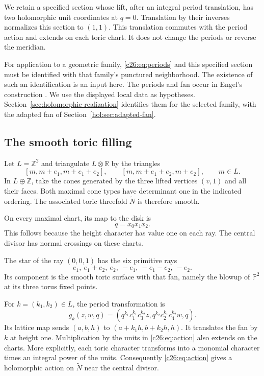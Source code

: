 We retain a specified section whose lift, after an integral period
translation, has two holomorphic unit coordinates at $q=0$.
Translation by their inverses normalizes this section to $(1,1)$.
This translation commutes with the period action and extends on each
toric chart. It does not change the periods or reverse the meridian.

For application to a geometric family, \eqref{c26:eq:periods} and this
specified section must be identified with that family's punctured
neighborhood. The existence of such an identification is an input here.
The periods and fan occur in Engel's construction
\cite[Propositions 2.7--2.9, pp.~5--7]{Engel}.
We use the displayed local data as hypotheses.
Section~\ref{sec:holomorphic-realization} identifies them for the
selected family, with the adapted fan of
Section~\ref{hol:sec:adapted-fan}.

\subsection{The smooth toric filling}

Let $L=\mathbb Z^2$ and triangulate $L\otimes\mathbb R$ by the triangles
\[
[m,m+e_1,m+e_1+e_2],\qquad
[m,m+e_1+e_2,m+e_2],\qquad m\in L.
\]
In $L\oplus\mathbb Z$, take the cones generated by the three lifted
vertices $(v,1)$ and all their faces.
Both maximal cone types have determinant one in the indicated ordering.
The associated toric threefold $\widetilde N$ is therefore smooth.

On every maximal chart, its map to the disk is
\begin{equation}\label{c26:eq:chart}
q=x_0x_1x_2.
\end{equation}
This follows because the height character has value one on each ray.
The central divisor has normal crossings on these charts.

The star of the ray $(0,0,1)$ has the six primitive rays
\[
e_1,\ e_1+e_2,\ e_2,\ -e_1,\ -e_1-e_2,\ -e_2.
\]
Its component is the smooth toric surface with that fan, namely the
blowup of $\mathbb P^2$ at its three torus fixed points.

For $k=(k_1,k_2)\in L$, the period transformation is
\begin{equation}\label{c26:eq:action}
g_k(z,w,q)=
\left(q^{k_1}c_1^{k_1}c_3^{k_2}z,
q^{k_2}c_2^{k_1}c_4^{k_2}w,q\right).
\end{equation}
Its lattice map sends $(a,b,h)$ to $(a+k_1h,b+k_2h,h)$.
It translates the fan by $k$ at height one.
Multiplication by the units in \eqref{c26:eq:action} also extends on the
charts. More explicitly, each toric character transforms into a monomial
character times an integral power of the units.
Consequently \eqref{c26:eq:action} gives a holomorphic action on
$\widetilde N$ near the central divisor.

